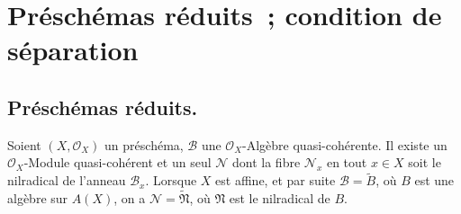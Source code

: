 \section{Préschémas réduits~; condition de séparation}
\label{section:I.5-fr}

\subsection{Préschémas réduits.}
\label{subsection:I.5.1-fr}

\begin{proposition}[5.1.1]
\label{I.5.1.1-fr}
Soient $(X,\mathscr{O}_X)$ un préschéma, $\mathscr{B}$ une
$\mathscr{O}_X$-Algèbre quasi-cohérente. Il existe un
$\mathscr{O}_X$-Module quasi-cohérent et un seul $\mathscr{N}$ dont la fibre
$\mathscr{N}_x$ en tout $x\in X$ soit le nilradical de l'anneau
$\mathscr{B}_x$. Lorsque $X$ est affine, et par suite
$\mathscr{B}=\widetilde{B}$, où $B$ est une algèbre sur $A(X)$, on a
$\mathscr{N}=\widetilde{\mathfrak{N}}$, où $\mathfrak{N}$ est le nilradical
de $B$.
\end{proposition}
